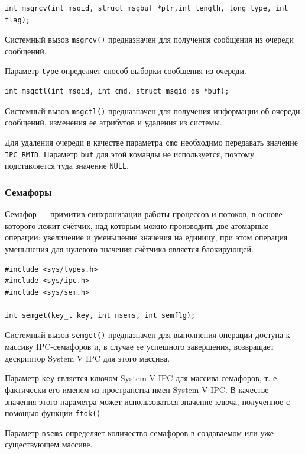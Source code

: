 \documentclass[a4paper,14pt]{extarticle}
\begin{document}
\begin{verbatim}
int msgrcv(int msqid, struct msgbuf *ptr,int length, long type, int flag);
\end{verbatim}

Системный вызов \verb|msgrcv()| предназначен для получения сообщения из очереди сообщений. 

Параметр \verb|type| определяет способ выборки сообщения из очереди.

\begin{verbatim}
int msgctl(int msqid, int cmd, struct msqid_ds *buf);
\end{verbatim}

Системный вызов \verb|msgctl()| предназначен для получения информации об очереди сообщений, изменения ее атрибутов и удаления из системы.

Для удаления очереди в качестве параметра \verb|cmd| необходимо передавать значение \verb|IPC_RMID|. Параметр \verb|buf| для этой команды не используется, поэтому подставляется туда значение \verb|NULL|.

\subsubsection{Семафоры}

Семафор --- примитив синхронизации работы процессов и потоков, в основе которого лежит счётчик, над которым можно производить две атомарные операции: увеличение и уменьшение значения на единицу, при этом операция уменьшения для нулевого значения счётчика является блокирующей.

\begin{verbatim}
#include <sys/types.h>
#include <sys/ipc.h>
#include <sys/sem.h>

int semget(key_t key, int nsems, int semflg);
\end{verbatim}

Системный вызов \verb|semget()| предназначен для выполнения операции доступа к массиву IPC-семафоров и, в случае ее успешного завершения, возвращает дескриптор System V IPC для этого массива.

Параметр \verb|key| является ключом System V IPC для массива семафоров, т. е. фактически его именем из пространства имен System V IPC. В качестве значения этого параметра может использоваться значение ключа, полученное с помощью функции \verb|ftok()|.

Параметр \verb|nsems| определяет количество семафоров в создаваемом или уже существующем массиве.
\end{document}
